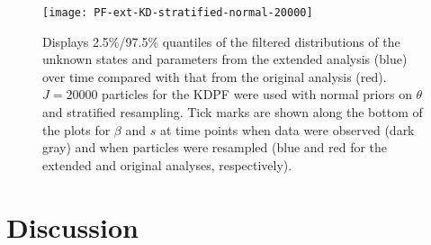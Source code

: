 \documentclass{elsarticle}
\begin{document}
\begin{figure}
\centering
\texttt{[image: PF-ext-KD-stratified-normal-20000]}
\caption{Displays 2.5\%/97.5\% quantiles of the filtered distributions of the unknown states and parameters from the extended analysis (blue) over time compared with that from the original analysis (red).  $J = 20000$ particles for the KDPF were used with normal priors on $\theta$ and stratified resampling.  Tick marks are shown along the bottom of the plots for $\beta$ and $s$ at time points when data were observed (dark gray) and when particles were resampled (blue and red for the extended and original analyses, respectively).} \label{fig:ext}
\end{figure}

\section{Discussion \label{sec:discussion}}



\clearpage



\end{document}
